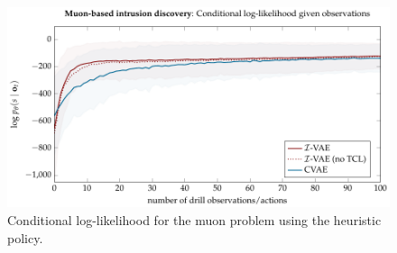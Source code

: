 \begin{figure}[t!]
    \centering
    \includegraphics[width=0.825\linewidth]{figures/ivae/muon/cll-muon.pdf}
    \caption{Conditional log-likelihood for the muon problem using the heuristic policy.}
    \label{fig:clls_muon}
\end{figure}


